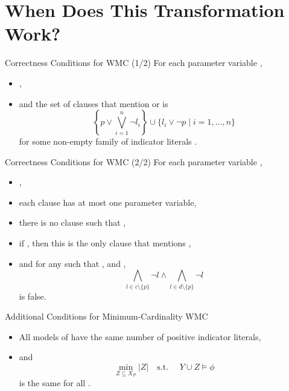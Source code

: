 \documentclass{beamer}
\begin{document}
\section{When Does This Transformation Work?}

\begin{frame}{Correctness Conditions for WMC (1/2)}
  For each parameter variable ,
  \begin{itemize}
  \item {},
  \item and the set of clauses that mention  or  is
    \[
      \left\{p \lor \bigvee_{i=1}^n \neg l_i \right\} \cup \{ l_i \lor \neg p
      \mid i = 1, \dots, n \}
    \]
    for some non-empty family of \alert{indicator} literals
    .
  \end{itemize}
\end{frame}

\begin{frame}{Correctness Conditions for WMC (2/2)}
  For each parameter variable ,
  \begin{itemize}
  \item {},
  \item each clause has at most one parameter variable,
  \item there is no clause  such that ,
  \item if , then this is the only clause that
    mentions ,
  \item and for any  such that ,
     and ,
    \[
      \bigwedge_{l \in c \setminus \{ p \}} \neg l \land \bigwedge_{l \in d
        \setminus \{ p \}} \neg l
    \]
    is false.
  \end{itemize}
\end{frame}

\begin{frame}{Additional Conditions for Minimum-Cardinality WMC}
  \begin{itemize}
  \item All models of 
    have the same number of positive indicator literals,
  \item and
    \[
      \min_{Z \subseteq X_P} |Z| \quad \text{s.t. } \quad Y \cup Z \models \phi
    \]
    is the same for all .
  \end{itemize}
\end{frame}
\end{document}
